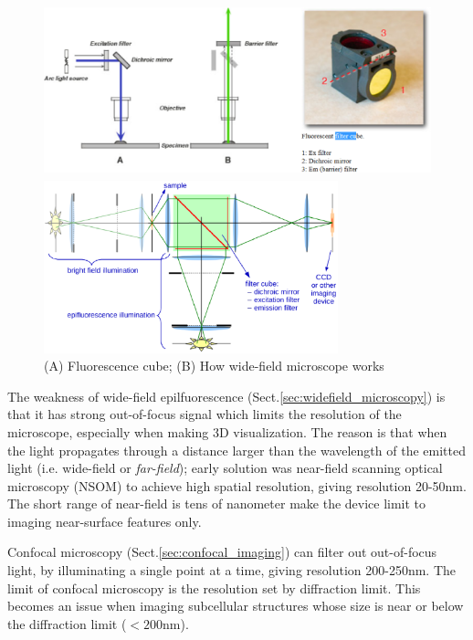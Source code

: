 
\begin{figure}[hbt]
\centerline{\includegraphics[height=5cm,
    angle=0]{./images/epifluorescence-microscope.eps}}
  \centerline{\includegraphics[height=5cm,
    angle=0]{./images/widefield_microscope.eps}}
  \caption{(A) Fluorescence cube; (B) How wide-field microscope works}
  \label{fig:widefield_micro}
\end{figure}

The weakness of wide-field epilfuorescence (Sect.\ref{sec:widefield_microscopy})
is that it has strong out-of-focus signal which limits the resolution of the
microscope, especially when making 3D visualization. The reason is that when the
light propagates through a distance larger than the wavelength of the emitted
light (i.e. wide-field or {\it far-field}); early solution was near-field
scanning optical microscopy (NSOM) to achieve high spatial resolution, giving
resolution 20-50nm. The short range of near-field is tens of nanometer make the
device limit to imaging near-surface features only.

Confocal microscopy (Sect.\ref{sec:confocal_imaging}) can filter
out out-of-focus light, by illuminating a single point at a time, giving
resolution 200-250nm. The limit of confocal microscopy is the resolution set by
diffraction limit. This becomes an issue when imaging subcellular structures
whose size is near or below the diffraction limit ($< 200$nm). 

